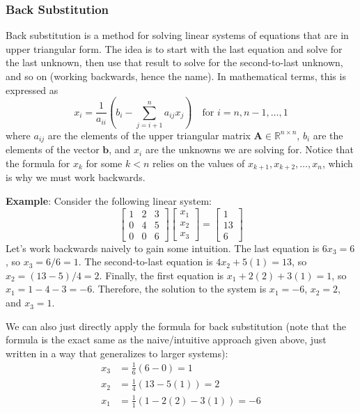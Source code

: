 \subsubsection{Back Substitution}
Back substitution is a method for solving linear systems of equations that are in upper triangular form. The idea is to start with the last equation and solve for the last unknown, then use that result to solve for the second-to-last unknown, and so on (working backwards, hence the name). In mathematical terms, this is expressed as
\begin{equation*}
    x_i = \frac{1}{a_{ii}} \left( b_i - \sum_{j=i+1}^{n} a_{ij} x_j \right) \quad \text{for } i = n, n-1, \dots, 1
\end{equation*}
where $ a_{ij} $ are the elements of the upper triangular matrix $ \mathbf{A} \in \mathbb{R}^{n \times n} $, $ b_i $ are the elements of the vector $ \mathbf{b} $, and $ x_i $ are the unknowns we are solving for. Notice that the formula for $ x_k $ for some $k < n$ relies on the values of $ x_{k+1}, x_{k+2}, \dots, x_n $, which is why we must work backwards.

\begin{exampleBox}
    \textbf{Example}: Consider the following linear system:
    \begin{equation*}
        \begin{bmatrix}
        1 & 2 & 3 \\
        0 & 4 & 5 \\
        0 & 0 & 6
        \end{bmatrix}
        \begin{bmatrix}
        x_1 \\ x_2 \\ x_3
        \end{bmatrix}
        =
        \begin{bmatrix}
        1 \\ 13 \\ 6
        \end{bmatrix}
    \end{equation*}
    Let's work backwards naively to gain some intuition. The last equation is $ 6x_3 = 6 $, so $ x_3 = 6/6 = 1 $. The second-to-last equation is $ 4x_2 + 5(1) = 13 $, so $ x_2 = (13 - 5)/4 = 2 $. Finally, the first equation is $ x_1 + 2(2) + 3(1) = 1 $, so $ x_1 = 1 - 4 - 3 = -6 $. Therefore, the solution to the system is $ x_1 = -6 $, $ x_2 = 2 $, and $ x_3 = 1 $.

    We can also just directly apply the formula for back substitution (note that the formula is the exact same as the naive/intuitive approach given above, just written in a way that generalizes to larger systems):
    \begin{align*}
        x_3 & = \frac{1}{6} \left( 6 - 0 \right) = 1 \\
        x_2 & = \frac{1}{4} \left( 13 - 5(1) \right) = 2 \\
        x_1 & = \frac{1}{1} \left( 1 - 2(2) - 3(1) \right) = -6
    \end{align*}
\end{exampleBox}

